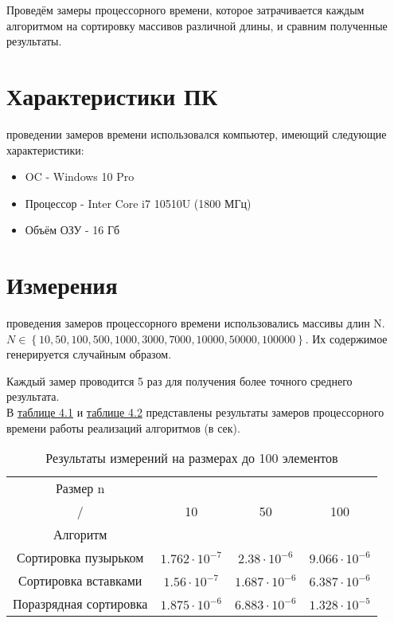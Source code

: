 Проведём замеры процессорного времени, которое затрачивается каждым алгоритмом на сортировку массивов различной длины, и сравним полученные результаты.

\section{Характеристики ПК}
 проведении замеров времени использовался компьютер, имеющий следующие характеристики:
\begin{itemize}
	\item OC - Windows 10 Pro
	\item Процессор - Inter Core i7 10510U (1800 МГц)
	\item Объём ОЗУ - 16 Гб
\end{itemize}

\section{Измерения}
 проведения замеров процессорного времени использовались массивы длин N. \\
$N \in \left\lbrace 10, 50, 100, 500, 1000, 3000, 7000, 10000, 50000, 100000 \right\rbrace$.
Их содержимое генерируется случайным образом.

Каждый замер проводится 5 раз для получения более точного среднего результата.\\

В \hyperref[table_4_1]{таблице 4.1} и \hyperref[table_4_2]{таблице 4.2} представлены результаты замеров процессорного времени работы реализаций алгоритмов (в сек).

\begin{table}[ph] \label{table_4_1}
	\caption{Результаты измерений на размерах до 100 элементов}
	\centering
	\begin{tabular}{|c|c|c|c|}
		\hline
		Размер n&&&\\
		/    &10 &50 & 100 \\
		Алгоритм    &&&\\
		\hline
		Сортировка пузырьком & $1.762\cdot10^{-7}$ & $2.38\cdot10^{-6}$ & $9.066\cdot10^{-6}$ \\
		\hline
		Сортировка вставками & $1.56\cdot10^{-7}$ & $1.687\cdot10^{-6}$ & $6.387\cdot10^{-6}$ \\
		\hline
		Поразрядная сортировка & $1.875\cdot10^{-6}$ & $6.883\cdot10^{-6}$ & $1.328\cdot10^{-5}$ \\
		\hline
	\end{tabular}
\end{table}

